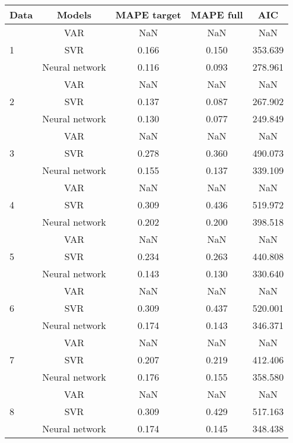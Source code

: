 \documentclass[12pt]{article}
\begin{document}
\begin{longtable}{|p{2cm}|c|c|c|c|}
\hline
Data & Models &MAPE target & MAPE full & AIC\\ 
\hline
\multirow{3}{*}{1} &VAR &   NaN &    NaN &    NaN\\ 
\cline{2-5}
 &SVR &   0.166 &    0.150 &    353.639\\ 
\cline{2-5}
 &Neural network &   0.116 &    0.093 &    278.961\\ 
\cline{2-5}
\hline
\multirow{3}{*}{2} &VAR &   NaN &    NaN &    NaN\\ 
\cline{2-5}
 &SVR &   0.137 &    0.087 &    267.902\\ 
\cline{2-5}
 &Neural network &   0.130 &    0.077 &    249.849\\ 
\cline{2-5}
\hline
\multirow{3}{*}{3} &VAR &   NaN &    NaN &    NaN\\ 
\cline{2-5}
 &SVR &   0.278 &    0.360 &    490.073\\ 
\cline{2-5}
 &Neural network &   0.155 &    0.137 &    339.109\\ 
\cline{2-5}
\hline
\multirow{3}{*}{4} &VAR &   NaN &    NaN &    NaN\\ 
\cline{2-5}
 &SVR &   0.309 &    0.436 &    519.972\\ 
\cline{2-5}
 &Neural network &   0.202 &    0.200 &    398.518\\ 
\cline{2-5}
\hline
\multirow{3}{*}{5} &VAR &   NaN &    NaN &    NaN\\ 
\cline{2-5}
 &SVR &   0.234 &    0.263 &    440.808\\ 
\cline{2-5}
 &Neural network &   0.143 &    0.130 &    330.640\\ 
\cline{2-5}
\hline
\multirow{3}{*}{6} &VAR &   NaN &    NaN &    NaN\\ 
\cline{2-5}
 &SVR &   0.309 &    0.437 &    520.001\\ 
\cline{2-5}
 &Neural network &   0.174 &    0.143 &    346.371\\ 
\cline{2-5}
\hline
\multirow{3}{*}{7} &VAR &   NaN &    NaN &    NaN\\ 
\cline{2-5}
 &SVR &   0.207 &    0.219 &    412.406\\ 
\cline{2-5}
 &Neural network &   0.176 &    0.155 &    358.580\\ 
\cline{2-5}
\hline
\multirow{3}{*}{8} &VAR &   NaN &    NaN &    NaN\\ 
\cline{2-5}
 &SVR &   0.309 &    0.429 &    517.163\\ 
\cline{2-5}
 &Neural network &   0.174 &    0.145 &    348.438\\ 

\end{longtable}
\end{document}
